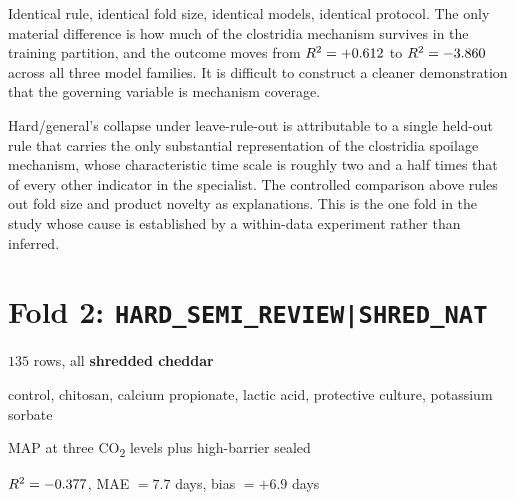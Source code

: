 Identical rule, identical fold size, identical models, identical protocol.
The only material difference is how much of the clostridia mechanism
survives in the training partition, and the outcome moves from
$R^2 = +0.612$ to $R^2 = -3.860$ across all three model families. It is
difficult to construct a cleaner demonstration that the governing variable
is mechanism coverage.

\begin{findingbox}[title={Verified explanation, not a hypothesis}]
Hard/general's collapse under leave-rule-out is attributable to a single
held-out rule that carries the only substantial representation of the
clostridia spoilage mechanism, whose characteristic time scale is roughly
two and a half times that of every other indicator in the specialist. The
controlled comparison above rules out fold size and product novelty as
explanations. This is the one fold in the study whose cause is established
by a within-data experiment rather than inferred.
\end{findingbox}




\section{Fold 2: \texttt{HARD\_SEMI\_REVIEW|SHRED\_NAT}}

\begin{description}[leftmargin=1.5em, style=nextline, font=\bfseries\color{dgreen}, itemsep=1pt]
\item[Held out] $135$ rows, all \textbf{shredded cheddar}
\item[Treatments] control, chitosan, calcium propionate, lactic acid,
  protective culture, potassium sorbate
\item[Packaging] MAP at three CO\textsubscript{2} levels plus
  high-barrier sealed
\item[Result] $R^2 = -0.377$, MAE $= 7.7$ days, bias $= +6.9$ days
\end{description}

